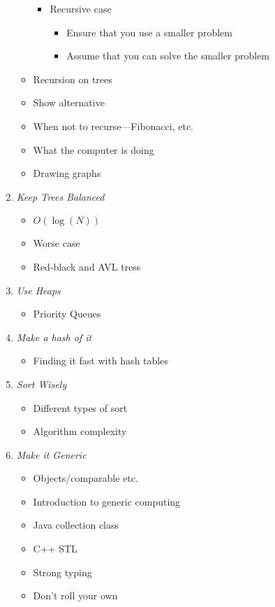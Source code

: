 \documentclass{article}
\begin{document}
\begin{enumerate}
\begin{itemize}
\begin{itemize}
    \item Recursive case
      \begin{itemize}
      \item Ensure that you use a smaller problem
      \item Assume that you can solve the smaller problem
      \end{itemize}
    \end{itemize}
  \item Recursion on trees
  \item Show alternative
  \item When not to recurse---Fibonacci, etc.
  \item What the computer is doing
  \item Drawing graphs
  \end{itemize}
\item \emph{Keep Trees Balanced}
  \begin{itemize}
  \item $O(\log(N))$
  \item Worse case
  \item Red-black and AVL tress
  \end{itemize}
\item \emph{Use Heaps}
  \begin{itemize}
  \item Priority Queues
  \end{itemize}
\item \emph{Make a hash of it}
  \begin{itemize}
  \item Finding it fast with hash tables
  \end{itemize}
\item \emph{Sort Wisely}
  \begin{itemize}
  \item Different types of sort
  \item Algorithm complexity
  \end{itemize}
\item \emph{Make it Generic}
  \begin{itemize}
  \item Objects/comparable etc.
  \item Introduction to generic computing
  \item Java collection class
  \item C++ STL
  \item Strong typing
  \item Don't roll your own
  \end{itemize}

\end{enumerate}
\end{document}
